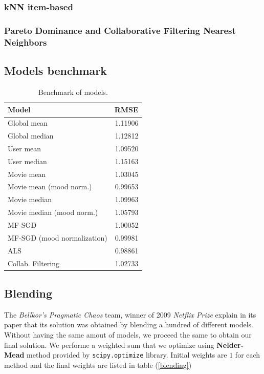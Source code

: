 \documentclass[10pt,conference,compsocconf]{IEEEtran}
\begin{document}
\subsubsection{kNN item-based}
\subsubsection{Pareto Dominance and Collaborative Filtering Nearest Neighbors}

\subsection{Models benchmark}

\begin{table}[htbp]
\centering
\begin{tabular}[c]{| l r |}
\hline
Model & RMSE \\
\hline 
\hline
Global mean					& 1.11906	\\
Global median 					& 1.12812	\\
User mean 					& 1.09520 \\
User median					& 1.15163 \\
Movie mean					& 1.03045 \\
Movie mean (mood norm.)		& 0.99653 \\
Movie median					& 1.09963 \\
Movie median (mood norm.)		& 1.05793 \\
MF-SGD 						& 1.00052 \\
MF-SGD (mood normalization) 		& 0.99981 \\
ALS							& 0.98861 \\
Collab. Filtering					& 1.02733 \\
\hline


\end{tabular}
  \caption{Benchmark of models.}
  \label{benchmark}
\end{table}




\subsection{Blending}

The \textit{Bellkor's Pragmatic Chaos} team, winner of 2009 \textit{Netflix Prize} explain in its paper that its solution was obtained by blending a hundred of different models. \cite{BellKore_netflix} Without having the same amout of models, we proceed the same to obtain our final solution. We performe a weighted sum that we optimize using \textbf{Nelder-Mead} method provided by \texttt{scipy.optimize} library. Initial weights are $1$ for each method and the final weights are listed in table (\ref{blending})
\end{document}
